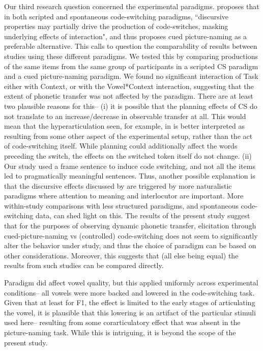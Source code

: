 \documentclass[charis,linguex]{glossa}
\begin{document}
Our third research question concerned the experimental paradigms. \cite{olson2013bilingual} proposes that in both scripted and spontaneous code-switching paradigms, ``discursive properties may partially drive the production of code-switches, masking underlying effects of interaction", and thus proposes cued picture-naming as a preferable alternative. This calls to question the comparability of results between studies using these different paradigms. We tested this by comparing productions of the same items from the same group of participants in a scripted CS paradigm and a cued picture-naming paradigm. We found no significant interaction of Task either with Context, or with the Vowel*Context interaction, suggesting that the extent of phonetic transfer was not affected by the paradigm. 
There are at least two plausible reasons for this-- (i) it is possible that the planning effects of CS do not translate to an increase/decrease in observable transfer at all. This would mean that the hyperarticulation seen, for example, in \cite{muldner2019phonetics} is better interpreted as resulting from some other aspect of the experimental setup, rather than the act of code-switching itself. While planning could additionally affect the words preceding the switch, the effects on the switched token itself do not change. (ii) Our study used a frame sentence to induce code switching, and not all the items led to pragmatically meaningful sentences. Thus, another possible explanation is that the discursive effects discussed by \cite{olson2013bilingual} are triggered by more naturalistic paradigms where attention to meaning and interlocutor are important. More within-study comparisons with less structured paradigms, and spontaneous code-switching data, can shed light on this. The results of the present study suggest that for the purposes of observing dynamic phonetic transfer, elicitation through cued-picture-naming vs (controlled) code-switching does not seem to significantly alter the behavior under study, and thus the choice of paradigm can be based on other considerations. Moreover, this suggests that (all else being equal) the results from such studies can be compared directly. 

Paradigm did affect vowel quality, but this applied uniformly across experimental conditions-- all vowels were more backed and lowered in the code-switching task. Given that at least for F1, the effect is limited to the early stages of articulating the vowel, it is plausible that this lowering is an artifact of the particular stimuli used here-- resulting from some corarticulatory effect that was absent in the picture-naming task. While this is intriguing, it is beyond the scope of the present study.  
\end{document}
